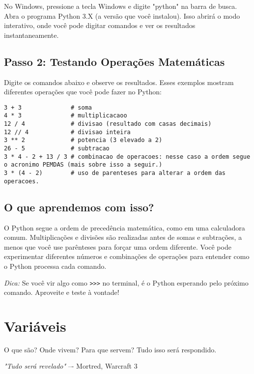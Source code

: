 \documentclass[12pt]{book}
\begin{document}
	No Windows, pressione a tecla Windows e digite "python" na barra de busca. Abra o programa Python 3.X (a versão que você instalou). Isso abrirá o modo interativo, onde você pode digitar comandos e ver os resultados instantaneamente.
	\subsection{Passo 2: Testando Operações Matemáticas}
	
	Digite os comandos abaixo e observe os resultados. Esses exemplos mostram diferentes operações que você pode fazer no Python:
	\begin{lstlisting}[caption={Python como calculadora.}]
3 + 3              # soma
4 * 3              # multiplicacaoo
12 / 4             # divisao (resultado com casas decimais)
12 // 4            # divisao inteira
3 ** 2             # potencia (3 elevado a 2)
26 - 5             # subtracao
3 * 4 - 2 + 13 / 3 # combinacao de operacoes: nesse caso a ordem segue o acronimo PEMDAS (mais sobre isso a seguir.)
3 * (4 - 2)        # uso de parenteses para alterar a ordem das operacoes.\end{lstlisting}
	
	\subsection{O que aprendemos com isso?}
	
	O Python segue a ordem de precedência matemática, como em uma calculadora comum. Multiplicações e divisões são realizadas antes de somas e subtrações, a menos que você use parênteses para forçar uma ordem diferente.\newline
	Você pode experimentar diferentes números e combinações de operações para entender como o Python processa cada comando.
	
	\textit{Dica:} Se você vir algo como \texttt{>{>}>} no terminal, é o Python esperando pelo próximo comando. Aproveite e teste à vontade!
	
	\section{Variáveis}
	
	O que são? Onde vivem? Para que servem? Tudo isso será respondido.
	
	\hspace*{12mm}\textit{"Tudo será revelado"} –- Mortred, Warcraft 3\newline
	
\end{document}
